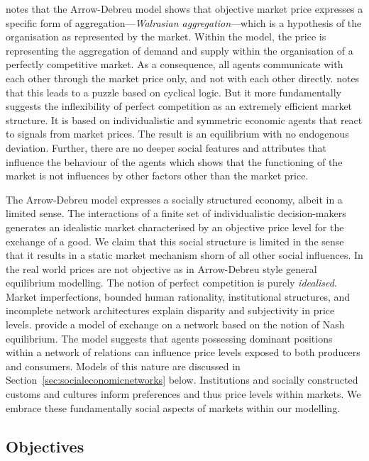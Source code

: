 
\medskip\noindent \citet[p.~5]{Gilles1990} notes that the Arrow-Debreu model shows that objective market price expresses a specific form of aggregation---\emph{Walrasian aggregation}---which is a hypothesis of the organisation as represented by the market. Within the model, the price is representing the aggregation of demand and supply within the organisation of a perfectly competitive market. As a consequence, all agents communicate with each other through the market price only, and not with each other directly. \citet{GillesDiamantaras2003} notes that this leads to a puzzle based on cyclical logic. But it more fundamentally suggests the inflexibility of perfect competition as an extremely efficient market structure. It is based on individualistic and symmetric economic agents that react to signals from market prices. The result is an equilibrium with no endogenous deviation. Further, there are no deeper social features and attributes that influence the behaviour of the agents which shows that the functioning of the market is not influences by other factors other than the market price.

The Arrow-Debreu model expresses a socially structured economy, albeit in a limited sense. The interactions of a finite set of individualistic decision-makers generates an idealistic market characterised by an objective price level for the exchange of a good. We claim that this social structure is limited in the sense that it results in a static market mechanism shorn of all other social influences. In the real world prices are not objective as in Arrow-Debreu style general equilibrium modelling. The notion of perfect competition is purely \emph{idealised}. Market imperfections, bounded human rationality, institutional structures, and incomplete network architectures explain disparity and subjectivity in price levels. \citet{Blume2009} provide a model of exchange on a network based on the notion of Nash equilibrium. The model suggests that agents possessing dominant positions within a network of relations can influence price levels exposed to both producers and consumers. Models of this nature are discussed in Section~\ref{sec:socialeconomicnetworks} below. Institutions and socially constructed customs and cultures inform preferences and thus price levels within markets. We embrace these fundamentally social aspects of markets within our modelling.

\subsection{Objectives}

